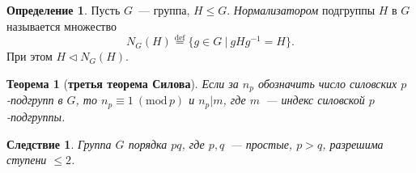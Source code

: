 \documentclass[a4paper, 14pt]{extarticle}
\newcommand{\deq}{\stackrel{\mathrm{def}}{=}}
\renewcommand{\mod}{\mathrm{mod} \,}
\theoremstyle{definition}
\newtheorem{definition}{Определение}
\theoremstyle{plain}
\newtheorem*{theorem*}{Теорема}
\numberwithin{theorem}{section}
\numberwithin{definition}{section}
\numberwithin{statement}{section}
\numberwithin{lemma}{section}
\newtheorem*{consequence*}{Следствие}
\numberwithin{consequence}{section}
\begin{document}
        \begin{definition}
            Пусть $G$~--- группа, ${H \leqslant G.}$ \textit{Нормализатором} подгруппы $H$ в $G$ называется множество
            \begin{equation*}
                N_G(H) \deq \{g \in G \ | \ gHg^{-1} = H\}.
            \end{equation*}
            При этом ${H \lhd N_G(H).}$
        \end{definition}
        \begin{theorem*}[\textbf{третья теорема Силова}]
             Если за $n_p$ обозначить число силовских $p$-подгрупп в $G$, то $n_p \equiv 1 \ (\mod p)$ и $n_p|m$, где $m$~--- индекс силовской $p$-подгруппы. 
        \end{theorem*}
        \begin{consequence*}
             Группа $G$ порядка $pq$, где $p,q$~--- простые, ${p > q}$, разрешима ступени $\leqslant2$.
        \end{consequence*}
        \newpage
\end{document}
